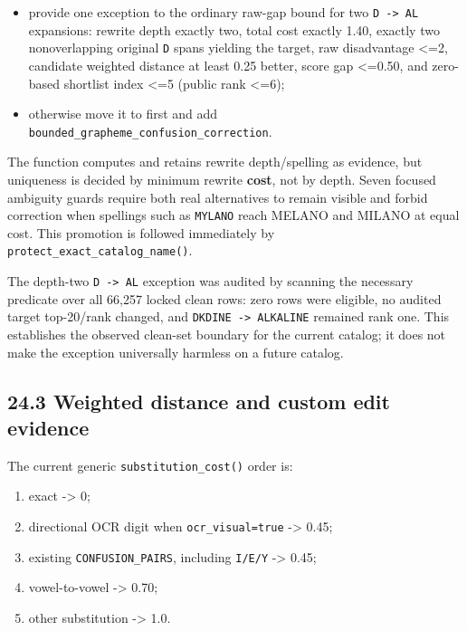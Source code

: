 \begin{itemize}
\item
  provide one exception to the ordinary raw-gap bound for two \texttt{D\ -\textgreater{}\ AL} expansions: rewrite depth exactly two, total cost exactly 1.40, exactly two nonoverlapping original \texttt{D} spans yielding the target, raw disadvantage \textless=2, candidate weighted distance at least 0.25 better, score gap \textless=0.50, and zero-based shortlist index \textless=5 (public rank \textless=6);
\item
  otherwise move it to first and add \texttt{bounded\_\allowbreak{}grapheme\_\allowbreak{}confusion\_\allowbreak{}correction}.
\end{itemize}

The function computes and retains rewrite depth/spelling as evidence, but uniqueness is decided by minimum rewrite \textbf{cost}, not by depth. Seven focused ambiguity guards require both real alternatives to remain visible and forbid correction when spellings such as \texttt{MYLANO} reach MELANO and MILANO at equal cost. This promotion is followed immediately by \texttt{protect\_\allowbreak{}exact\_\allowbreak{}catalog\_\allowbreak{}name()}.

The depth-two \texttt{D\ -\textgreater{}\ AL} exception was audited by scanning the necessary predicate over all 66,257 locked clean rows: zero rows were eligible, no audited target top-20/rank changed, and \texttt{DKDINE\ -\textgreater{}\ ALKALINE} remained rank one. This establishes the observed clean-set boundary for the current catalog; it does not make the exception universally harmless on a future catalog.

\subsection{24.3 Weighted distance and custom edit evidence}\label{243-weighted-distance-and-custom-edit-evidence}

The current generic \texttt{substitution\_\allowbreak{}cost()} order is:

\begin{enumerate}
\def\labelenumi{\arabic{enumi}.}
\tightlist
\item
  exact -\textgreater{} 0;
\item
  directional OCR digit when \texttt{ocr\_\allowbreak{}visual=true} -\textgreater{} 0.45;
\item
  existing \texttt{CONFUSION\_\allowbreak{}PAIRS}, including \texttt{I/E/Y} -\textgreater{} 0.45;
\item
  vowel-to-vowel -\textgreater{} 0.70;
\item
  other substitution -\textgreater{} 1.0.
\end{enumerate}

